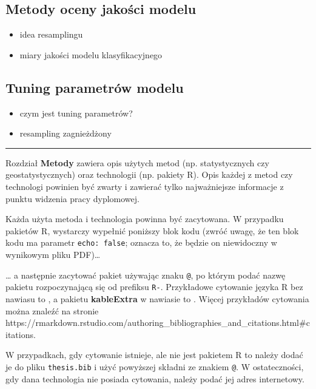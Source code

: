 \documentclass{amuthesis}
\begin{document}
\hypertarget{sec-resampling}{%
\subsection{Metody oceny jakości modelu}\label{sec-resampling}}

\begin{itemize}
\item
  idea resamplingu
\item
  miary jakości modelu klasyfikacyjnego
\end{itemize}

\hypertarget{sec-tuning}{%
\subsection{Tuning parametrów modelu}\label{sec-tuning}}

\begin{itemize}
\item
  czym jest tuning parametrów?
\item
  resampling zagnieżdżony
\end{itemize}

\begin{center}\rule{0.5\linewidth}{0.5pt}\end{center}

Rozdział \textbf{Metody} zawiera opis użytych metod (np. statystycznych
czy geostatystycznych) oraz technologii (np. pakiety R). Opis każdej z
metod czy technologi powinien być zwarty i zawierać tylko najważniejsze
informacje z punktu widzenia pracy dyplomowej.

Każda użyta metoda i technologia powinna być zacytowana. W przypadku
pakietów R, wystarczy wypełnić poniższy blok kodu (zwróć uwagę, że ten
blok kodu ma parametr \texttt{echo:\ false}; oznacza to, że będzie on
niewidoczny w wynikowym pliku PDF)\ldots{}

\ldots{} a następnie zacytować pakiet używając znaku \texttt{@}, po
którym podać nazwę pakietu rozpoczynającą się od prefiksu \texttt{R-}.
Przykładowe cytowanie języka R bez nawiasu to \textcite{R-base}, a
pakietu \textbf{kableExtra} w nawiasie to \autocite{R-kableExtra}.
Więcej przykładów cytowania można znaleźć na stronie
https://rmarkdown.rstudio.com/authoring\_bibliographies\_and\_citations.html\#citations.

W przypadkach, gdy cytowanie istnieje, ale nie jest pakietem R to należy
dodać je do pliku \texttt{thesis.bib} i użyć powyższej składni ze
znakiem \texttt{@}. W ostateczności, gdy dana technologia nie posiada
cytowania, należy podać jej adres internetowy.
\end{document}
